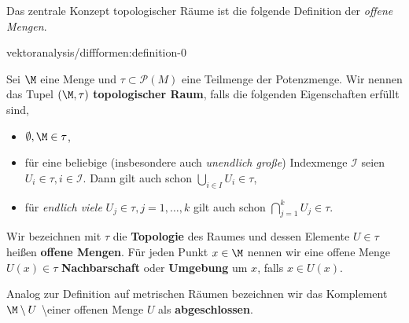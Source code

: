 \documentclass[letterpaper,10pt,english]{jupyterBook}
\begin{document}
\par
Das zentrale Konzept topologischer Räume ist die folgende Definition der \emph{offene Mengen}.
\begin{definition}{}{vektoranalysis/diffformen:definition-0}



\par
Sei \(\M\) eine Menge und \(\tau \subset \mathcal{P}(M)\) eine Teilmenge der Potenzmenge.
Wir nennen das Tupel \((\M,\tau)\) \textbf{topologischer Raum}, falls die folgenden Eigenschaften erfüllt sind,
\begin{itemize}
\item {} 
\par
\(\emptyset, \M \in \tau\),

\item {} 
\par
für eine beliebige (insbesondere auch \emph{unendlich große}) Indexmenge \(\mathcal{I}\) seien \(U_i\in\tau, i\in \mathcal{I}\). Dann gilt auch schon \(\bigcup_{i\in I} U_i \in \tau\),

\item {} 
\par
für \emph{endlich viele} \(U_j\in\tau, j=1,\ldots, k\) gilt auch schon \(\bigcap_{j=1}^k U_j \in \tau\).

\end{itemize}

\par
Wir bezeichnen mit \(\tau\) die \textbf{Topologie} des Raumes und dessen Elemente \(U\in\tau\) heißen \textbf{offene Mengen}.
Für jeden Punkt \(x\in \M\) nennen wir eine offene Menge \(U(x) \in \tau\) \textbf{Nachbarschaft} oder \textbf{Umgebung} um \(x\), falls \(x\in U(x)\).

\par
Analog zur Definition auf metrischen Räumen bezeichnen wir das Komplement \(\M \setminus U\) \textbackslash{}einer offenen Menge \(U\) als \textbf{abgeschlossen}.
\end{definition}
\end{document}
